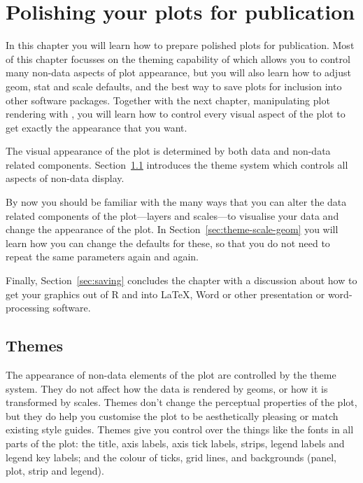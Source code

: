 

% 


\chapter{Polishing your plots for publication}
\label{cha:polishing}

In this chapter you will learn how to prepare polished plots for publication.  Most of this chapter focusses on the theming capability of \ggplot which allows you to control many non-data aspects of plot appearance, but you will also learn how to adjust geom, stat and scale defaults, and the best way to save plots for inclusion into other software packages.  Together with the next chapter, manipulating plot rendering with , you will learn how to control every visual aspect of the plot to get exactly the appearance that you want.

The visual appearance of the plot is determined by both data and non-data related components.  Section~\ref{sec:themes} introduces the theme system which controls all aspects of non-data display.

By now you should be familiar with the many ways that you can alter the data related components of the plot---layers and scales---to visualise your data and change the appearance of the plot.  In Section~\ref{sec:theme-scale-geom} you will learn how you can change the defaults for these, so that you do not need to repeat the same parameters again and again.

Finally, Section~\ref{sec:saving} concludes the chapter with a discussion about how to get your graphics out of R and into \LaTeX, Word or other presentation or word-processing software.

\section{Themes} 
\label{sec:themes}

The appearance of non-data elements of the plot are controlled by the theme system.  They do not affect how the data is rendered by geoms, or how it is transformed by scales.  Themes don't change the perceptual properties of the plot, but they do help you customise the plot to be aesthetically pleasing or match existing style guides.  Themes give you control over the things like the  fonts in all parts of the plot: the title, axis labels, axis tick labels, strips, legend labels and legend key labels; and the colour of ticks, grid lines, and backgrounds (panel, plot, strip and legend).

